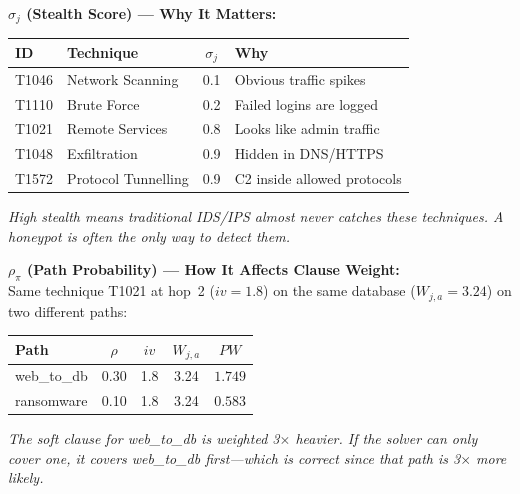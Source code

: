 \documentclass[journal]{IEEEtran}
\begin{document}
\begin{examplebox}
\textbf{$\sigma_j$ (Stealth Score) --- Why It Matters:}
\begin{center}
\small
\renewcommand{\arraystretch}{1.1}
\begin{tabular}{@{}llcl@{}}
\toprule
\textbf{ID} & \textbf{Technique} & $\sigma_j$ & \textbf{Why} \\
\midrule
T1046 & Network Scanning    & 0.1 & Obvious traffic spikes \\
T1110 & Brute Force         & 0.2 & Failed logins are logged \\
T1021 & Remote Services     & 0.8 & Looks like admin traffic \\
T1048 & Exfiltration        & 0.9 & Hidden in DNS/HTTPS \\
T1572 & Protocol Tunnelling & 0.9 & C2 inside allowed protocols \\
\bottomrule
\end{tabular}
\end{center}
\textit{High stealth means traditional IDS/IPS almost never
catches these techniques.
A honeypot is often the \emph{only} way to detect them.}
\end{examplebox}

\begin{examplebox}
\textbf{$\rho_\pi$ (Path Probability) ---
How It Affects Clause Weight:}\\[3pt]
Same technique T1021 at hop~2 ($iv=1.8$) on the same
database ($W_{j,a}=3.24$) on two different paths:
\begin{center}
\small
\renewcommand{\arraystretch}{1.1}
\begin{tabular}{@{}lcccc@{}}
\toprule
\textbf{Path} & $\rho$ & $iv$ & $W_{j,a}$ & $PW$ \\
\midrule
web\_to\_db & 0.30 & 1.8 & 3.24 & $\mathbf{1.749}$ \\
ransomware  & 0.10 & 1.8 & 3.24 & $\mathbf{0.583}$ \\
\bottomrule
\end{tabular}
\end{center}
\textit{The soft clause for web\_to\_db is weighted
3$\times$ heavier.
If the solver can only cover one, it covers web\_to\_db
first---which is correct since that path is 3$\times$
more likely.}
\end{examplebox}
\end{document}
